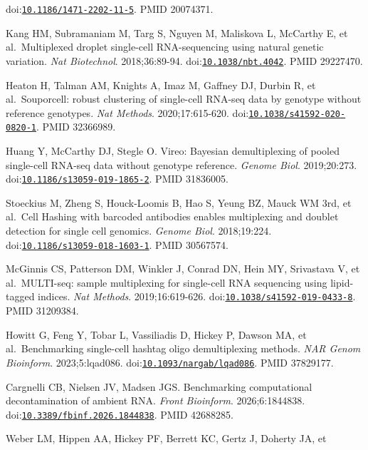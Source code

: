 \documentclass[11pt]{article}
\begin{document}
\begin{enumerate}[label={[\arabic*]},leftmargin=2.6em,labelsep=0.5em,itemsep=1.5pt]
  doi:\href{https://doi.org/10.1186/1471-2202-11-5}{\nolinkurl{10.1186/1471-2202-11-5}}.
  PMID 20074371.
\item
  Kang HM, Subramaniam M, Targ S, Nguyen M, Maliskova L, McCarthy E, et
  al.~Multiplexed droplet single-cell RNA-sequencing using natural
  genetic variation. \emph{Nat Biotechnol}. 2018;36:89-94.
  doi:\href{https://doi.org/10.1038/nbt.4042}{\nolinkurl{10.1038/nbt.4042}}. PMID
  29227470.
\item
  Heaton H, Talman AM, Knights A, Imaz M, Gaffney DJ, Durbin R, et
  al.~Souporcell: robust clustering of single-cell RNA-seq data by
  genotype without reference genotypes. \emph{Nat Methods}.
  2020;17:615-620.
  doi:\href{https://doi.org/10.1038/s41592-020-0820-1}{\nolinkurl{10.1038/s41592-020-0820-1}}.
  PMID 32366989.
\item
  Huang Y, McCarthy DJ, Stegle O. Vireo: Bayesian demultiplexing of
  pooled single-cell RNA-seq data without genotype reference.
  \emph{Genome Biol}. 2019;20:273.
  doi:\href{https://doi.org/10.1186/s13059-019-1865-2}{\nolinkurl{10.1186/s13059-019-1865-2}}.
  PMID 31836005.
\item
  Stoeckius M, Zheng S, Houck-Loomis B, Hao S, Yeung BZ, Mauck WM 3rd,
  et al.~Cell Hashing with barcoded antibodies enables multiplexing and
  doublet detection for single cell genomics. \emph{Genome Biol}.
  2018;19:224.
  doi:\href{https://doi.org/10.1186/s13059-018-1603-1}{\nolinkurl{10.1186/s13059-018-1603-1}}.
  PMID 30567574.
\item
  McGinnis CS, Patterson DM, Winkler J, Conrad DN, Hein MY, Srivastava
  V, et al.~MULTI-seq: sample multiplexing for single-cell RNA
  sequencing using lipid-tagged indices. \emph{Nat Methods}.
  2019;16:619-626.
  doi:\href{https://doi.org/10.1038/s41592-019-0433-8}{\nolinkurl{10.1038/s41592-019-0433-8}}.
  PMID 31209384.
\item
  Howitt G, Feng Y, Tobar L, Vassiliadis D, Hickey P, Dawson MA, et
  al.~Benchmarking single-cell hashtag oligo demultiplexing methods.
  \emph{NAR Genom Bioinform}. 2023;5:lqad086.
  doi:\href{https://doi.org/10.1093/nargab/lqad086}{\nolinkurl{10.1093/nargab/lqad086}}.
  PMID 37829177.
\item
  Cargnelli CB, Nielsen JV, Madsen JGS. Benchmarking computational
  decontamination of ambient RNA. \emph{Front Bioinform}.
  2026;6:1844838.
  doi:\href{https://doi.org/10.3389/fbinf.2026.1844838}{\nolinkurl{10.3389/fbinf.2026.1844838}}.
  PMID 42688285.
\item
  Weber LM, Hippen AA, Hickey PF, Berrett KC, Gertz J, Doherty JA, et

\end{enumerate}
\end{document}
